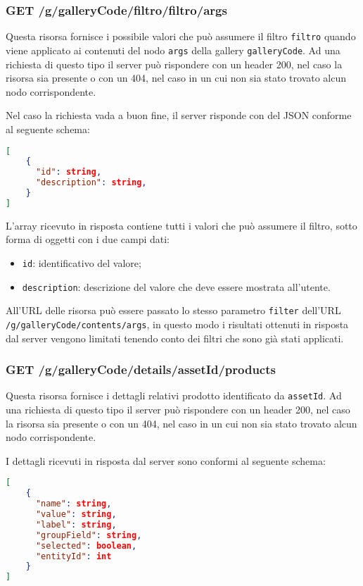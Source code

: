 \subsubsection{GET /g/{galleryCode}/filtro/{filtro}/{args}}

Questa risorsa fornisce i possibile valori che può assumere il filtro \texttt{filtro} quando viene applicato ai contenuti del nodo \texttt{args} della gallery \texttt{galleryCode}.
Ad una richiesta di questo tipo il server può rispondere con un header 200, nel caso la risorsa sia presente o con un 404, nel caso in un cui non sia stato trovato alcun nodo corrispondente.

Nel caso la richiesta vada a buon fine, il server risponde con del JSON conforme al seguente schema:

\begin{lstlisting}[language=JSON, caption=JSON Schema di GET /g/{galleryCode}/filtro/{filtro}/{args}]
[
	{
	  "id": string,
	  "description": string,
	}
]
\end{lstlisting}

L'array ricevuto in risposta contiene tutti i valori che può assumere il filtro, sotto forma di oggetti con i due campi dati:
\begin{itemize}
\item \texttt{id}: identificativo del valore;
\item \texttt{description}: descrizione del valore che deve essere mostrata all'utente. 
\end{itemize}

All'URL delle risorsa può essere passato lo stesso parametro \texttt{filter} dell'URL \texttt{/g/{galleryCode}/contents/{args}}, in questo modo i risultati ottenuti in risposta dal server vengono limitati tenendo conto dei filtri che sono già stati applicati.

\subsubsection{GET /g/{galleryCode}/details/{assetId}/products}

Questa risorsa fornisce i dettagli relativi prodotto identificato da \texttt{assetId}.
Ad una richiesta di questo tipo il server può rispondere con un header 200, nel caso la risorsa sia presente o con un 404, nel caso in un cui non sia stato trovato alcun nodo corrispondente.

I dettagli ricevuti in risposta dal server sono conformi al seguente schema:
\begin{lstlisting}[language=JSON, caption=JSON Schema di GET /g/{galleryCode}/filtro/{filtro}/{args}]
[
	{
	  "name": string,
	  "value": string,
	  "label": string,
	  "groupField": string,
	  "selected": boolean,
	  "entityId": int
	}
]
\end{lstlisting}

